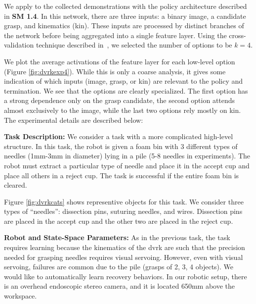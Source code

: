 We apply \alg to the collected demonstrations with the policy architecture described in \textbf{SM 1.4}. In this network, there are three inputs: a binary \textsf{image}, a candidate \textsf{grasp}, and kinematics (\textsf{kin}). These inputs are processed by distinct branches of the network before being aggregated into a single feature layer.  Using the cross-validation technique described in~, we selected the number of options to be $k=4$.

We plot the average activations of the feature layer for each low-level option (Figure \ref{fig:dvrkexp4}). While this is only a coarse analysis, it gives some indication of which inputs (\textsf{image}, \textsf{grasp}, or \textsf{kin}) are relevant to the policy and termination. We see that the options are clearly specialized. The first option has a strong dependence only on the \textsf{grasp} candidate, the second option attends almost exclusively to the \textsf{image}, while the last two options rely mostly on \textsf{kin}.
The experimental details are described below:

\vspace{0.5em} \noindent \textbf{Task Description: } We consider a task with a more complicated high-level structure.
In this task, the robot is given a foam bin with 3 different types of needles (1mm-3mm in diameter) lying in a pile (5-8 needles in experiments).
The robot must extract a particular type of needle  and place it in the accept cup and place all others in a reject cup.
The task is successful if the entire foam bin is cleared.

Figure \ref{fig:dvrkcats} shows representive objects for this task. We consider three types of ``needles'': dissection pins, suturing needles, and wires.
Dissection pins are placed in the accept cup and the other two are placed in the reject cup.


\vspace{0.5em} \noindent \textbf{Robot and State-Space Parameters: } As in the previous task, the task requires learning because the kinematics of the dvrk are such that the precision needed for grasping needles requires visual servoing.
However, even with visual servoing, failures are common due to the pile (grasps of 2, 3, 4 objects).
We would like to automatically learn recovery behaviors. 
In our robotic setup, there is an overhead endoscopic stereo camera, and it is located 650mm above the workspace.

